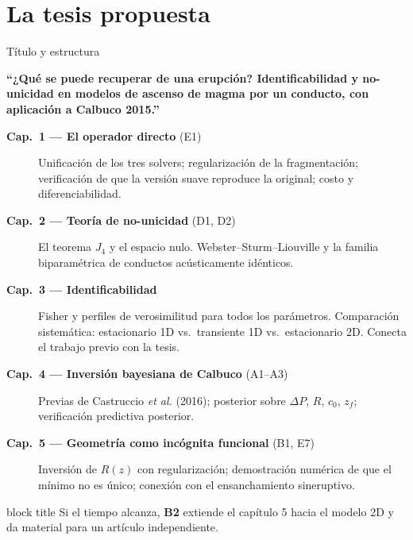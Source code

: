 \documentclass[aspectratio=169,10pt,t]{beamer}
\newcommand{\mensaje}[1]{%
  \vfill
  \begin{beamercolorbox}[wd=\linewidth,sep=0.4em,rounded=true]{block title}
  \footnotesize #1
  \end{beamercolorbox}}
\begin{document}
\section{La tesis propuesta}

\begin{frame}{Título y estructura}
\begin{block}{}
\centering
\textbf{``¿Qué se puede recuperar de una erupción? Identificabilidad y
no-unicidad en modelos de ascenso de magma por un conducto, con aplicación a
Calbuco 2015.''}
\end{block}

\vspace{0.4em}
\footnotesize
\begin{description}
  \item[\textbf{Cap.\ 1 — El operador directo} (E1)] Unificación de los tres
    solvers; regularización de la fragmentación; verificación de que la versión
    suave reproduce la original; costo y diferenciabilidad.
  \item[\textbf{Cap.\ 2 — Teoría de no-unicidad} (D1, D2)] El teorema $J_4$ y el
    espacio nulo. Webster–Sturm–Liouville y la familia biparamétrica de
    conductos acústicamente idénticos.
  \item[\textbf{Cap.\ 3 — Identificabilidad} ] Fisher y perfiles de verosimilitud
    para todos los parámetros. Comparación sistemática: estacionario 1D
    vs.\ transiente 1D vs.\ estacionario 2D.
    \alert{Conecta el trabajo previo con la tesis.}
  \item[\textbf{Cap.\ 4 — Inversión bayesiana de Calbuco} (A1–A3)] Previas de
    Castruccio \emph{et al.} (2016); posterior sobre $\Delta P$, $R$, $c_0$,
    $z_f$; verificación predictiva posterior.
  \item[\textbf{Cap.\ 5 — Geometría como incógnita funcional} (B1, E7)]
    Inversión de $R(z)$ con regularización; demostración numérica de que el
    mínimo no es único; conexión con el ensanchamiento sineruptivo.
\end{description}

\mensaje{Si el tiempo alcanza, \textbf{B2} extiende el capítulo 5 hacia el
modelo 2D y da material para un artículo independiente.}
\end{frame}
\end{document}
